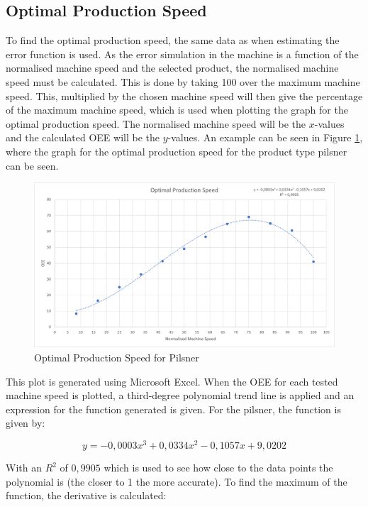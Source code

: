 \subsection{Optimal Production Speed}
To find the optimal production speed, the same data as when estimating the error
function is used. As the error simulation in the machine is a function of the
normalised machine speed and the selected product, the normalised machine speed
must be calculated. This is done by taking 100 over the maximum machine speed.
This, multiplied by the chosen machine speed will then give the percentage of
the maximum machine speed, which is used when plotting the graph for the optimal
production speed. The normalised machine speed will be the \(x\)-values and the
calculated OEE will be the \(y\)-values. An example can be seen in Figure
\ref{figure:ops_pilsner}, where the graph for the optimal production speed for
the product type pilsner can be seen.

\begin{figure}[ht]
	\centering
	\includegraphics[width=1\linewidth]{images/ops/pilsner.png}
	\caption{Optimal Production Speed for Pilsner}
	\label{figure:ops_pilsner}
\end{figure}

This plot is generated using Microsoft Excel. When the OEE for each tested
machine speed is plotted, a third-degree polynomial trend line is applied and an
expression for the function generated is given. For the pilsner, the function is
given by:

\[y = -0,0003x^3+0,0334x^2-0,1057x+9,0202\]


With an \(R^2\) of \(0,9905\) which is used to see how close to the data points
the polynomial is (the closer to 1 the more accurate). To find the maximum of
the function, the derivative is calculated:

